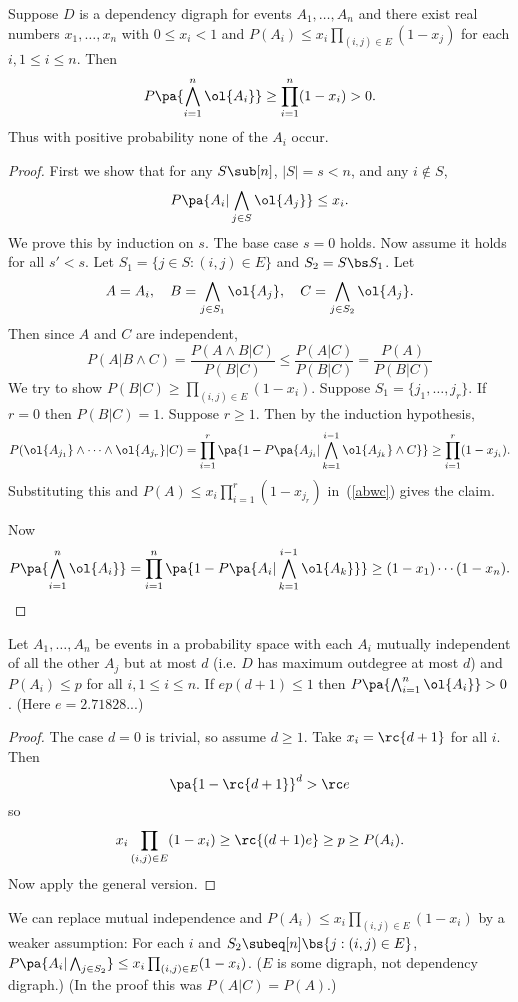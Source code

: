 \begin{lem}
Suppose $D$ is a dependency digraph for events $A_1,\ldots, A_n$ and there exist real numbers $x_1,\ldots, x_n$ with $0\leq x_i<1$ and $P(A_i)\leq x_i\prod_{(i,j)\in E}(1-x_j)$ for each $i,1\leq i\leq n$. Then
\[
P\pa{
\bigwedge_{i=1}^n \ol{A_i}}
\geq
\prod_{i=1}^n (1-x_i)>0.
\]
Thus with positive probability none of the $A_i$ occur.
\end{lem}
\begin{proof}
First we show that for any $S\sub [n]$, $|S|=s<n$, and any $i\nin S$,
\[
P\pa{A_i|
\bigwedge_{j\in S} \ol{A_j}}\leq x_i.
\]
We prove this by induction on $s$. The base case $s=0$ holds. Now assume it holds for all $s'<s$. Let $S_1=\{j\in S:(i,j)\in E\}$ and $S_2=S\bs S_1$. Let 
\[
A=A_i,\quad B=\bigwedge_{j\in S_1} \ol{A_j},\quad C=\bigwedge_{j\in S_2} \ol{A_j}.
\]
Then since $A$ and $C$ are independent,
\begin{equation}\label{abwc}
P(A|B\wedge C)=\frac{P(A\wedge B|C)}{P(B|C)}\leq \frac{P(A|C)}{P(B|C)}=\frac{P(A)}{P(B|C)}%
\end{equation}
We try to show $P(B|C)\geq \prod_{(i,j)\in E} (1-x_i)$. Suppose $S_1=\{j_1,\ldots, j_r\}$. If $r=0$ then $P(B|C)=1$. Suppose $r\geq 1$. Then by the induction hypothesis,
\[
P(\ol{A_{j_1}}\wedge\cdots \wedge\ol{A_{j_r}}|C)=
\prod_{i=1}^r\pa{1-P\pa{A_{j_i}|\bigwedge_{k=1}^{i-1}\ol{A_{j_k}}\wedge C}}\geq \prod_{i=1}^r (1-x_{j_i}).
\]
Substituting this and $P(A)\leq x_i\prod_{i=1}^r (1-x_{j_{r}})$ in~(\ref{abwc}) gives the claim.

Now
\[
P\pa{\bigwedge_{i=1}^n \ol{A_i}}
=
\prod_{i=1}^n \pa{1-P\pa{A_i|\bigwedge_{k=1}^{i-1}\ol{A_k}}}
\geq
(1-x_1)\cdots (1-x_n).
\]
\end{proof}
\begin{lem}
Let $A_1,\ldots, A_n$ be events in a probability space with each $A_i$ mutually independent of all the other $A_j$ but at most $d$ (i.e. $D$ has maximum outdegree at most $d$) and $P(A_i)\leq p$ for all $i,1\leq i\leq n$.
If $ep(d+1)\leq 1$ then $P\pa{\bigwedge_{i=1}^n \ol{A_i}}>0$. (Here $e=2.71828...$)
\end{lem}
\begin{proof}
The case $d=0$ is trivial, so assume $d\ge 1$. Take $x_i=\rc{d+1}$ for all $i$. Then
\[
\pa{1-\rc{d+1}}^d>\rc e
\]
so 
\[
x_i\prod_{(i,j)\in E}(1-x_i)\geq \rc{(d+1)e}\geq p\geq P(A_i).
\]
Now apply the general version.
\end{proof}
\begin{rem}
We can replace mutual independence and $P(A_i)\le x_i\prod_{(i,j)\in E}(1-x_i)$ by a weaker assumption: For each $i$ and $S_2\subeq [n]\bs\{j:(i,j)\in E\}$, $P\pa{A_i|\bigwedge_{j\in S_2}}\leq x_i\prod_{(i,j)\in E}(1-x_i)$. ($E$ is some digraph, not dependency digraph.) (In the proof this was $P(A|C)=P(A)$.)
\end{rem}
